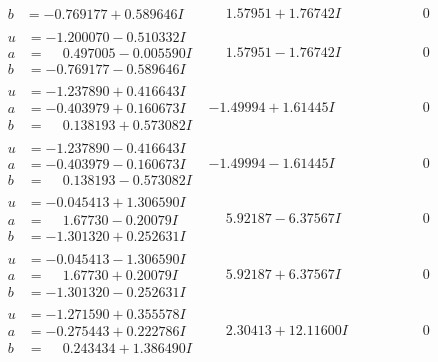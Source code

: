 \documentclass[1p]{elsarticle_modified}
\theoremstyle{definition}
\begin{document}
$$\begin{array}{c|c|c}
\begin{aligned}
b &= -0.769177 + 0.589646 I\end{aligned}
 & \phantom{-}1.57951 + 1.76742 I & \phantom{-0.000000 } 0 \\ \hline\begin{aligned}
u &= -1.200070 - 0.510332 I \\
a &= \phantom{-}0.497005 - 0.005590 I \\
b &= -0.769177 - 0.589646 I\end{aligned}
 & \phantom{-}1.57951 - 1.76742 I & \phantom{-0.000000 } 0 \\ \hline\begin{aligned}
u &= -1.237890 + 0.416643 I \\
a &= -0.403979 + 0.160673 I \\
b &= \phantom{-}0.138193 + 0.573082 I\end{aligned}
 & -1.49994 + 1.61445 I & \phantom{-0.000000 } 0 \\ \hline\begin{aligned}
u &= -1.237890 - 0.416643 I \\
a &= -0.403979 - 0.160673 I \\
b &= \phantom{-}0.138193 - 0.573082 I\end{aligned}
 & -1.49994 - 1.61445 I & \phantom{-0.000000 } 0 \\ \hline\begin{aligned}
u &= -0.045413 + 1.306590 I \\
a &= \phantom{-}1.67730 - 0.20079 I \\
b &= -1.301320 + 0.252631 I\end{aligned}
 & \phantom{-}5.92187 - 6.37567 I & \phantom{-0.000000 } 0 \\ \hline\begin{aligned}
u &= -0.045413 - 1.306590 I \\
a &= \phantom{-}1.67730 + 0.20079 I \\
b &= -1.301320 - 0.252631 I\end{aligned}
 & \phantom{-}5.92187 + 6.37567 I & \phantom{-0.000000 } 0 \\ \hline\begin{aligned}
u &= -1.271590 + 0.355578 I \\
a &= -0.275443 + 0.222786 I \\
b &= \phantom{-}0.243434 + 1.386490 I\end{aligned}
 & \phantom{-}2.30413 + 12.11600 I & \phantom{-0.000000 } 0 \\ \hline\begin{aligned}

\end{aligned}
\end{array}$$
\end{document}
